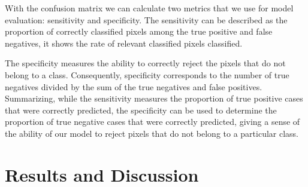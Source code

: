 \documentclass[12pt,a4paper]{scrartcl}
\begin{document}
With the confusion matrix we can calculate two metrics that we use for model evaluation: sensitivity and specificity. 
The sensitivity can be described as the proportion of correctly classified pixels among the true positive and false negatives, it shows the rate of relevant classified pixels classified. 

The specificity measures the ability to correctly reject the pixels that do not belong to a class. Consequently, specificity corresponds to the number of true negatives divided by the sum of the true negatives and false positives. Summarizing, while the sensitivity measures the proportion of true positive cases that were correctly predicted, the specificity can be used to determine the proportion of true negative cases that were correctly predicted, giving a sense of the ability of our model to reject pixels that do not belong to a particular class. 


\section{Results and Discussion}
\end{document}
